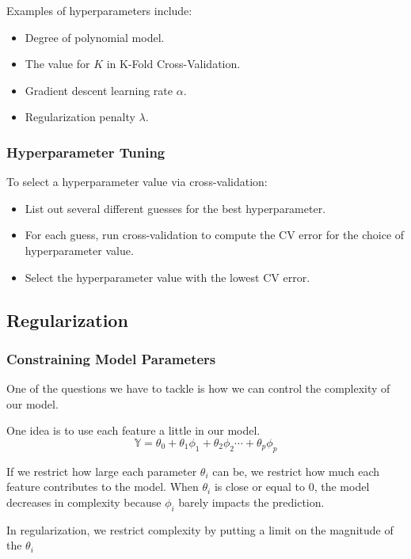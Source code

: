 \documentclass[openany]{book}
\begin{document}
\begin{example}
	Examples of hyperparameters include:
	\begin{itemize}
		\item Degree of polynomial model.
		\item The value for $K$ in K-Fold Cross-Validation.
		\item Gradient descent learning rate $\alpha$.
		\item Regularization penalty $\lambda$.
	\end{itemize}
\end{example}

\subsubsection{Hyperparameter Tuning}
To select a hyperparameter value via cross-validation:
\begin{itemize}
	\item List out several different guesses for the best hyperparameter.
	\item For each guess, run cross-validation to compute the CV error for the choice of hyperparameter value.
	\item Select the hyperparameter value with the lowest CV error.
\end{itemize}

\subsection{Regularization}
\subsubsection{Constraining Model Parameters}
One of the questions we have to tackle is how we can control the complexity of our model.

One idea is to use each feature a little in our model.
\begin{equation*}
	\mathbb Y = \theta_0 + \theta_1 \phi_1 + \theta_2\phi_2 \cdots + \theta_p\phi_p
\end{equation*}

If we restrict how large each parameter $\theta_i$ can be, we restrict how much each feature contributes to the model. When $\theta_i$ is close or equal to 0, the model decreases in complexity because $\phi_i$ barely impacts the prediction.

In regularization, we restrict complexity by putting a limit on the magnitude of the $\theta_i$
\end{document}
